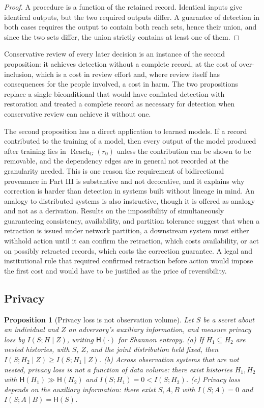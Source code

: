 \documentclass[11pt]{article}
\theoremstyle{plain}
\newtheorem{proposition}{Proposition}
\theoremstyle{definition}
\theoremstyle{remark}
\newcommand{\Reach}{\operatorname{Reach}}
\begin{document}
\begin{proof}
A procedure is a function of the retained record. Identical inputs give identical outputs, but the two required outputs differ. A guarantee of detection in both cases requires the output to contain both reach sets, hence their union, and since the two sets differ, the union strictly contains at least one of them.
\end{proof}

Conservative review of every later decision is an instance of the second proposition: it achieves detection without a complete record, at the cost of over-inclusion, which is a cost in review effort and, where review itself has consequences for the people involved, a cost in harm. The two propositions replace a single biconditional that would have conflated detection with restoration and treated a complete record as necessary for detection when conservative review can achieve it without one.

The second proposition has a direct application to learned models. If a record contributed to the training of a model, then every output of the model produced after training lies in $\Reach_G(r_0)$ unless the contribution can be shown to be removable, and the dependency edges are in general not recorded at the granularity needed. This is one reason the requirement of bidirectional provenance in Part III is substantive and not decorative, and it explains why correction is harder than detection in systems built without lineage in mind. An analogy to distributed systems is also instructive, though it is offered as analogy and not as a derivation. Results on the impossibility of simultaneously guaranteeing consistency, availability, and partition tolerance \cite{gilbert2002} suggest that when a retraction is issued under network partition, a downstream system must either withhold action until it can confirm the retraction, which costs availability, or act on possibly retracted records, which costs the correction guarantee. A legal and institutional rule that required confirmed retraction before action would impose the first cost and would have to be justified as the price of reversibility.

\subsection{Privacy}

\begin{proposition}[Privacy loss is not observation volume]\label{prop:privacy}
Let $S$ be a secret about an individual and $Z$ an adversary's auxiliary information, and measure privacy loss by $I(S;H\mid Z)$, writing $\mathsf{H}(\cdot)$ for Shannon entropy. (a) If $H_1\subseteq H_2$ are nested histories, with $S$, $Z$, and the joint distribution held fixed, then $I(S;H_2\mid Z)\geq I(S;H_1\mid Z)$. (b) Across observation systems that are not nested, privacy loss is not a function of data volume: there exist histories $H_1,H_2$ with $\mathsf{H}(H_1)\gg\mathsf{H}(H_2)$ and $I(S;H_1)=0<I(S;H_2)$. (c) Privacy loss depends on the auxiliary information: there exist $S,A,B$ with $I(S;A)=0$ and $I(S;A\mid B)=\mathsf{H}(S)$.
\end{proposition}
\end{document}
